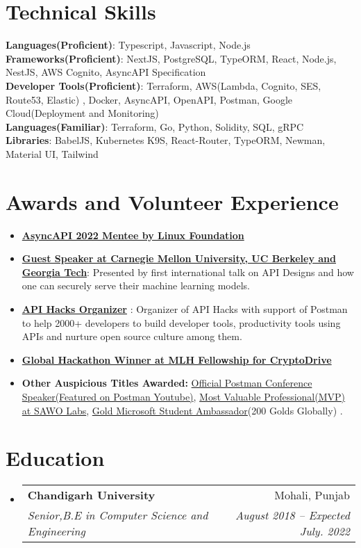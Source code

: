 \documentclass[letterpaper,11pt]{article}
\makeatletter
\newcommand{\resumeItem}[1]{
  \item\small{
    {#1 \vspace{-2pt}}
  }
}
\newcommand{\resumeSubheading}[4]{
  \vspace{-2pt}\item
    \begin{tabular*}{0.97\textwidth}[t]{l@{\extracolsep{\fill}}r}
      \textbf{#1} & #2 \\
      \textit{\small#3} & \textit{\small #4} \\
    \end{tabular*}\vspace{-7pt}
}
\newcommand{\resumeSubHeadingListStart}{\begin{itemize}[leftmargin=0.15in, label={}]}
\newcommand{\resumeSubHeadingListEnd}{\end{itemize}}
\newcommand{\resumeItemListStart}{\begin{itemize}}
\newcommand{\resumeItemListEnd}{\end{itemize}\vspace{-5pt}}
\makeatother
\begin{document}
\section{Technical Skills}
 \begin{itemize}[leftmargin=0.15in, label={}]
    \small{\item{
     \textbf{Languages(Proficient)}{: Typescript, Javascript, Node.js} \\
     \textbf{Frameworks(Proficient)}{: NextJS, PostgreSQL, TypeORM, React, Node.js, NestJS, AWS Cognito, AsyncAPI Specification  } \\
     \textbf{Developer Tools(Proficient)}{: Terraform, AWS(Lambda, Cognito, SES, Route53, Elastic) , Docker, AsyncAPI, OpenAPI, Postman, Google Cloud(Deployment and Monitoring) } \\
     \textbf{Languages(Familiar)}{: Terraform, Go, Python, Solidity, SQL, gRPC } \\
     \textbf{Libraries}{: BabelJS, Kubernetes K9S, React-Router, TypeORM, Newman, Material UI, Tailwind  }
    }}
 \end{itemize}

\section{Awards and Volunteer Experience }
 \begin{itemize}[leftmargin=0.15in, label={}]
    \small{\item{
        \resumeItemListStart
                \resumeItem{\textbf{\href{https://github.com/asyncapi/community/discussions/376\#discussioncomment-2890658}{AsyncAPI 2022 Mentee by Linux Foundation}}}
                \resumeItem{\textbf{\href{https://dsailtconference.org/schedule/}{Guest Speaker at Carnegie Mellon University, UC Berkeley and Georgia Tech}}: Presented by first international talk on API Designs and how one can securely serve their machine learning models.}
                \resumeItem{\textbf{\href{https://apihacks.co}{API Hacks Organizer} }: Organizer of API Hacks with support of Postman to help 2000+ developers to build developer tools, productivity tools using APIs and nurture open source culture among them.}
                \resumeItem{\textbf{\href{https://devpost.com/software/cryptodrive}{Global Hackathon Winner at MLH Fellowship for CryptoDrive}}}
                \resumeItem{\textbf{Other Auspicious Titles Awarded:} \href{https://www.youtube.com/watch?v=-P_IGKuYmeY}{Official Postman Conference Speaker(Featured on Postman Youtube)},  \href{https://twitter.com/SawoLabs/status/1418869910332055552}{Most Valuable Professional(MVP) at SAWO Labs}, \href{https://studentambassadors.microsoft.com/en-US/profile/49532}{Gold Microsoft Student Ambassador}(200 Golds Globally) .}
      \resumeItemListEnd
    }}
 \end{itemize}
 
\section{Education}
  \resumeSubHeadingListStart
    \resumeSubheading
      {Chandigarh University}{Mohali, Punjab}
      {Senior,B.E in Computer Science and Engineering}{August 2018 -- Expected July. 2022}
  \resumeSubHeadingListEnd
\end{document}
